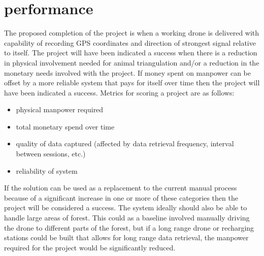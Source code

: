 \documentclass{article}
\begin{document}
\section{performance}
The proposed completion of the project is when a working drone is delivered with capability of recording GPS coordinates and direction of strongest signal relative to itself. The project will have been indicated a success when there is a reduction in physical involvement needed for animal triangulation and/or a reduction in the monetary needs involved with the project. If money spent on manpower can be offset by a more reliable system that pays for itself over time then the project will have been indicated a success. Metrics for scoring a project are as follows:
\begin{itemize}
    \item physical manpower required
    \item total monetary spend over time
    \item quality of data captured (affected by data retrieval frequency, interval between sessions, etc.)
    \item reliability of system
\end{itemize}

If the solution can be used as a replacement to the current manual process because of a significant increase in one or more of these categories then the project will be considered a success. The system ideally should also be able to handle large areas of forest. This could as a baseline involved manually driving the drone to different parts of the forest, but if a long range drone or recharging stations could be built that allows for long range data retrieval, the manpower required for the project would be significantly reduced.
\end{document}
